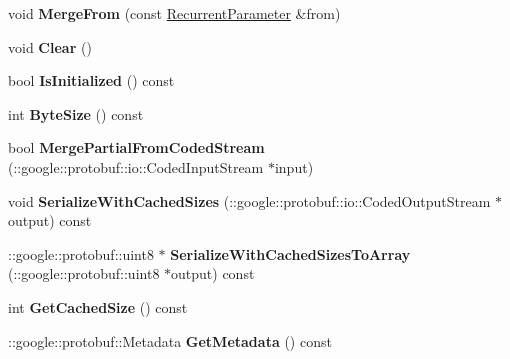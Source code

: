 \begin{DoxyCompactItemize}
\item 
\mbox{\label{classcaffe_1_1_recurrent_parameter_ad13ab1f1dd596a1fda9fbbfb545aac1b}} 
void {\bfseries Merge\+From} (const \mbox{\hyperlink{classcaffe_1_1_recurrent_parameter}{Recurrent\+Parameter}} \&from)
\item 
\mbox{\label{classcaffe_1_1_recurrent_parameter_aaac9ab62ce9db47d1b8f8bb8f81596d5}} 
void {\bfseries Clear} ()
\item 
\mbox{\label{classcaffe_1_1_recurrent_parameter_a32532caca583424274dc990ef4644ff2}} 
bool {\bfseries Is\+Initialized} () const
\item 
\mbox{\label{classcaffe_1_1_recurrent_parameter_af333245e69857b2e24a76c31f9bbfc07}} 
int {\bfseries Byte\+Size} () const
\item 
\mbox{\label{classcaffe_1_1_recurrent_parameter_a7713a055ca62165c3ee50c6c145cbe49}} 
bool {\bfseries Merge\+Partial\+From\+Coded\+Stream} (\+::google\+::protobuf\+::io\+::\+Coded\+Input\+Stream $\ast$input)
\item 
\mbox{\label{classcaffe_1_1_recurrent_parameter_ad05e2f20dadd6d66325e8588818e578e}} 
void {\bfseries Serialize\+With\+Cached\+Sizes} (\+::google\+::protobuf\+::io\+::\+Coded\+Output\+Stream $\ast$output) const
\item 
\mbox{\label{classcaffe_1_1_recurrent_parameter_a66cef55546909887b9e36cf0fb77751d}} 
\+::google\+::protobuf\+::uint8 $\ast$ {\bfseries Serialize\+With\+Cached\+Sizes\+To\+Array} (\+::google\+::protobuf\+::uint8 $\ast$output) const
\item 
\mbox{\label{classcaffe_1_1_recurrent_parameter_a54675a8f8917138252833faa5c4dce38}} 
int {\bfseries Get\+Cached\+Size} () const
\item 
\mbox{\label{classcaffe_1_1_recurrent_parameter_a6b4f8fd2355710af289fe8b640b32c19}} 
\+::google\+::protobuf\+::\+Metadata {\bfseries Get\+Metadata} () const

\end{DoxyCompactItemize}

